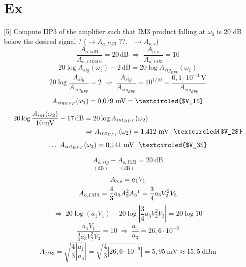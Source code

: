 \documentclass[11pt,a4paper]{article}
\begin{document}
\section{Ex}
[5]
Compute IIP3 of the amplifier such that IM3 product falling at $\omega_3$ is 20 dB below the desired signal ? \quad ($\to A_{o,IM3}$ ??, \ $\to A_{o,s}$)
\[ \frac{A_{o,s\mathrm{dB}}}{A_{o,IM3\mathrm{dB}}} = 20\,\mathrm{dB} \;\Rightarrow\; \frac{A_{o,s}}{A_{o,IM3}} = 10 \]
\[ 20\log A_{sig}(\omega_1) - 2\,\mathrm{dB} = 20\log A_{sig_{BPF}}(\omega_1) \]
\[ 20\log\frac{A_{sig}}{A_{sig_{BPF}}} = 2 \;\Rightarrow\; \frac{A_{sig}}{A_{sig_{BPF}}} = 10^{1/10} = \frac{0{,}1\cdot10^{-3}\ \mathrm{V}}{A_{sig_{BPF}}} \]
\[ A_{sig_{BPF}}(\omega_1) = 0{,}079\ \mathrm{mV} = \textcircled{$V_1$} \]
\begin{align*}
20\log\frac{A_{int}(\omega_2)}{10\,\mathrm{mV}} - 17\,\mathrm{dB} &= 20\log A_{int_{BPF}}(\omega_2)\\
&\Rightarrow A_{int_{BPF}}(\omega_2) = 1{,}412\ \mathrm{mV}\ \ \textcircled{$V_2$}
\end{align*}
\[ \ldots\ A_{int_{BPF}}(\omega_3) = 0{,}141\ \mathrm{mV}\ \ \textcircled{$V_3$} \]

\[ \underset{(\mathrm{dB})}{A_{o,sig}} - \underset{(\mathrm{dB})}{A_{o,IM3}} = 20\ \mathrm{dB} \]
\begin{gather*}
A_{o,s} = a_1V_1\\
A_{o,IM3} = \frac{4}{3}a_3A_2^2A_3\footnotemark = \frac{3}{4}a_3V_2^2V_3
\end{gather*}
\[ \Rightarrow\ 20\log(a_1V_1) - 20\log\left|\frac{3}{4}a_3V_2^2V_3\right| = 20\log 10 \]
\[ \frac{a_1V_1}{\frac{3}{4}a_3V_2^2V_3} = 10 \;\Rightarrow\; \frac{a_1}{a_3} = 26{,}6\cdot10^{-6} \]
\[ A_{IIP3} = \sqrt{\frac{4}{3}\left|\frac{a_1}{a_3}\right|} = \sqrt{\frac{4}{3}\left|26{,}6\cdot10^{-6}\right|} = 5{,}95\ \mathrm{mV} \approx 15{,}5\ \mathrm{dBm} \]
\end{document}
